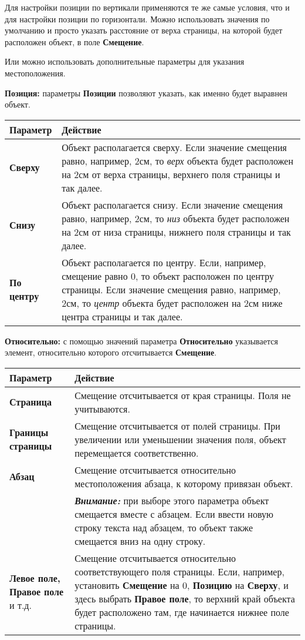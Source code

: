 \documentclass[a4paper,10pt]{article}
\begin{document}
 Для настройки позиции по вертикали применяются те же самые условия, что и для настройки позиции по горизонтали. Можно использовать значения по умолчанию и просто указать расстояние от верха страницы, на которой будет расположен объект, в поле \textbf{Смещение}.
 
 Или можно использовать дополнительные параметры для указания местоположения.
 
 \textbf{Позиция:} параметры \textbf{Позиции} позволяют указать, как именно будет выравнен объект.
 
 \begin{center}
\begin{tabular}{  m{4cm}  m{12cm}  }
 \textbf{Параметр} & \textbf{Действие}\\ 
 \hline
  \textbf{Сверху} & Объект располагается сверху. Если значение смещения равно, например, 2см, то \textit{верх} объекта будет расположен на 2см от верха страницы, верхнего поля страницы и так далее.\\
  \textbf{Снизу} & Объект располагается снизу. Если значение смещения равно, например, 2см, то \textit{низ} объекта будет расположен на 2см от низа страницы, нижнего поля страницы и так далее.\\ 
\textbf{По центру} & Объект располагается по центру. Если, например, смещение равно 0, то объект расположен по центру страницы. Если значение смещения равно, например, 2см, то \textit{центр} объекта будет расположен на 2см ниже центра страницы и так далее.\\
\end{tabular}
\end{center}

\textbf{Относительно:} с помощью значений параметра \textbf{Относительно} указывается элемент, относительно которого отсчитывается \textbf{Смещение}.

\begin{center}
\begin{tabular}{  m{4cm}  m{12cm}  }
 \textbf{Параметр} & \textbf{Действие}\\ 
 \hline
  \textbf{Страница} & Смещение отсчитывается от края страницы. Поля не учитываются.\\
  \textbf{Границы страницы} & Смещение отсчитывается от полей страницы. При увеличении или уменьшении значения поля, объект перемещается соответственно.\\ 
\textbf{Абзац} & Смещение отсчитывается относительно местоположения абзаца, к которому привязан объект.\\
\textbf{} & \textit{\textbf{Внимание:}} при выборе этого параметра объект смещается вместе с абзацем. Если ввести новую строку текста над абзацем, то объект также смещается вниз на одну строку.\\
\textbf{Левое поле, Правое поле} и т.д. & Смещение отсчитывается относительно соответствующего поля страницы. Если, например, установить \textbf{Смещение} на 0, \textbf{Позицию} на \textbf{Сверху}, и здесь выбрать \textbf{Правое поле}, то верхний край объекта будет расположено там, где начинается нижнее поле страницы.
\end{tabular}
\end{center}
\end{document}
